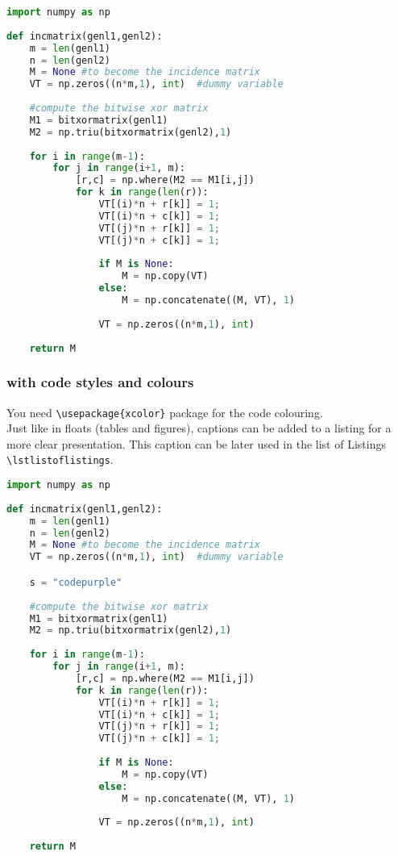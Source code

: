 \documentclass[letterpaper]{article}
\begin{document}
\begin{lstlisting}[language=Python]
import numpy as np
    
def incmatrix(genl1,genl2):
    m = len(genl1)
    n = len(genl2)
    M = None #to become the incidence matrix
    VT = np.zeros((n*m,1), int)  #dummy variable
    
    #compute the bitwise xor matrix
    M1 = bitxormatrix(genl1)
    M2 = np.triu(bitxormatrix(genl2),1) 
    
    for i in range(m-1):
        for j in range(i+1, m):
            [r,c] = np.where(M2 == M1[i,j])
            for k in range(len(r)):
                VT[(i)*n + r[k]] = 1;
                VT[(i)*n + c[k]] = 1;
                VT[(j)*n + r[k]] = 1;
                VT[(j)*n + c[k]] = 1;
    
                if M is None:
                    M = np.copy(VT)
                else:
                    M = np.concatenate((M, VT), 1)
    
                VT = np.zeros((n*m,1), int)
    
    return M
\end{lstlisting}

\subsubsection{with code styles and colours}

You need \verb+\usepackage{xcolor}+ package for the code colouring. \\
Just like in floats (tables and figures), captions can be added to a 
listing for a more clear presentation. This caption can be later used 
in the list of Listings \verb+\lstlistoflistings+.

\lstset{style=python-style}
\begin{lstlisting}[language=Python, caption=Python example]
import numpy as np
    
def incmatrix(genl1,genl2):
    m = len(genl1)
    n = len(genl2)
    M = None #to become the incidence matrix
    VT = np.zeros((n*m,1), int)  #dummy variable

    s = "codepurple"
    
    #compute the bitwise xor matrix
    M1 = bitxormatrix(genl1)
    M2 = np.triu(bitxormatrix(genl2),1) 
    
    for i in range(m-1):
        for j in range(i+1, m):
            [r,c] = np.where(M2 == M1[i,j])
            for k in range(len(r)):
                VT[(i)*n + r[k]] = 1;
                VT[(i)*n + c[k]] = 1;
                VT[(j)*n + r[k]] = 1;
                VT[(j)*n + c[k]] = 1;
    
                if M is None:
                    M = np.copy(VT)
                else:
                    M = np.concatenate((M, VT), 1)
    
                VT = np.zeros((n*m,1), int)
    
    return M
\end{lstlisting}

\newpage

\lstlistoflistings
\end{document}
